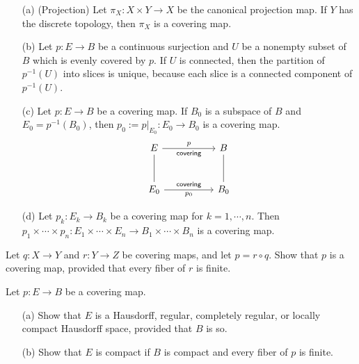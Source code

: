 \begin{exmp}
    \begin{enumerate}
        \item[(a)]
        {
            (Projection)
            Let $\pi_X: X\times Y\rightarrow X$ be the canonical projection map.
            If $Y$ has the discrete topology, then $\pi_X$ is a covering map.
        }
        \item[(b)]
        {
            Let $p: E\rightarrow B$ be a continuous surjection and $U$ be a nonempty subset of $B$ which is evenly covered by $p$.
            If $U$ is connected, then the partition of $p^{-1}(U)$ into slices is unique, because each slice is a connected component of $p^{-1}(U)$.
        }
        \item[(c)]
        {
            Let $p: E\rightarrow B$ be a covering map.
            If $B_0$ is a subspace of $B$ and $E_0=p^{-1}(B_0)$, then $p_0:=p|_{E_0}: E_0\rightarrow B_0$ is a covering map.
            \begin{equation*}
            \begin{tikzcd}[row sep=1.0cm, column sep=1.8cm]
                E\arrow[r, "p", "\textsf{covering}"']
                \arrow[d, dash]
                &
                B
                \arrow[d, dash]
                \\
                E_0\arrow[r, "p_0"', "\textsf{covering}"]
                &
                B_0
            \end{tikzcd}
            \end{equation*}
        }
        \item[(d)]
        {
            Let $p_k: E_k\rightarrow B_k$ be a covering map for $k=1, \cdots, n$.
            Then $p_1\times\cdots\times p_n: E_1\times\cdots\times E_n\rightarrow B_1\times\cdots\times B_n$ is a covering map.
        }
    \end{enumerate}
\end{exmp}

\color{red}
\begin{prob}
    Let $q: X\rightarrow Y$ and $r: Y\rightarrow Z$ be covering maps, and let $p=r\circ q$.
    Show that $p$ is a covering map, provided that every fiber of $r$ is finite.
\end{prob}
\begin{sol}
    
\end{sol}

\begin{prob}
    Let $p: E\rightarrow B$ be a covering map.
    \begin{enumerate}
        \item[(a)]
        {
            Show that $E$ is a Hausdorff, regular, completely regular, or locally compact Hausdorff space, provided that $B$ is so.
        }
        \item[(b)]
        {
            Show that $E$ is compact if $B$ is compact and every fiber of $p$ is finite.
        }
    \end{enumerate}
\end{prob}
\begin{sol}
    
\end{sol}
\color{black}